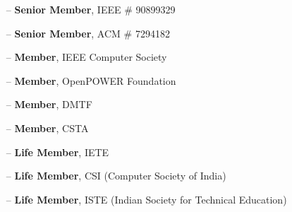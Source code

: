 \begin{itemize}
	\item[--] 
	\textbf{Senior Member}, IEEE  \# 90899329
	\item[--]
	\textbf{Senior Member}, ACM  \#  7294182
	\item[--]
	\textbf{Member}, IEEE Computer Society 
	\item[--]
	\textbf{Member}, OpenPOWER Foundation 
	\item[--]
	\textbf{Member}, DMTF  
	\item[--]
	\textbf{Member}, CSTA
	\item[--]
	\textbf{Life Member}, IETE
	\item[--]
	\textbf{Life Member}, CSI (Computer Society of India) 
	\item[--]
	\textbf{Life Member}, ISTE (Indian Society for Technical Education) 
\end{itemize}
